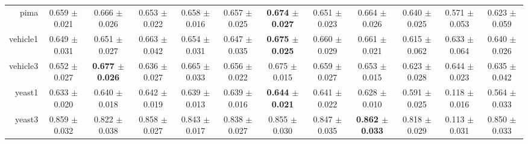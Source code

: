\begin{table}[!ht]
{\begin{tabular}{r c c c c c c c c c c c}
pima & 0.659 $\pm$ 0.021 & 0.666 $\pm$ 0.026 & 0.653 $\pm$ 0.022 & 0.658 $\pm$ 0.016 & 0.657 $\pm$ 0.025 & \textbf{0.674 $\pm$ 0.027} & 0.651 $\pm$ 0.023 & 0.664 $\pm$ 0.026 & 0.640 $\pm$ 0.025 & 0.571 $\pm$ 0.053 & 0.623 $\pm$ 0.059 \\
vehicle1 & 0.649 $\pm$ 0.031 & 0.651 $\pm$ 0.027 & 0.663 $\pm$ 0.042 & 0.654 $\pm$ 0.031 & 0.647 $\pm$ 0.035 & \textbf{0.675 $\pm$ 0.025} & 0.660 $\pm$ 0.029 & 0.661 $\pm$ 0.021 & 0.615 $\pm$ 0.062 & 0.633 $\pm$ 0.064 & 0.640 $\pm$ 0.026 \\
vehicle3 & 0.652 $\pm$ 0.027 & \textbf{0.677 $\pm$ 0.026} & 0.636 $\pm$ 0.027 & 0.665 $\pm$ 0.033 & 0.656 $\pm$ 0.022 & 0.675 $\pm$ 0.015 & 0.659 $\pm$ 0.027 & 0.653 $\pm$ 0.015 & 0.623 $\pm$ 0.028 & 0.644 $\pm$ 0.023 & 0.635 $\pm$ 0.042 \\
yeast1 & 0.633 $\pm$ 0.020 & 0.640 $\pm$ 0.018 & 0.642 $\pm$ 0.019 & 0.639 $\pm$ 0.013 & 0.639 $\pm$ 0.016 & \textbf{0.644 $\pm$ 0.021} & 0.641 $\pm$ 0.022 & 0.628 $\pm$ 0.010 & 0.591 $\pm$ 0.025 & 0.118 $\pm$ 0.016 & 0.564 $\pm$ 0.033 \\
yeast3 & 0.859 $\pm$ 0.032 & 0.822 $\pm$ 0.038 & 0.858 $\pm$ 0.027 & 0.843 $\pm$ 0.017 & 0.838 $\pm$ 0.027 & 0.855 $\pm$ 0.030 & 0.847 $\pm$ 0.035 & \textbf{0.862 $\pm$ 0.033} & 0.818 $\pm$ 0.029 & 0.113 $\pm$ 0.031 & 0.850 $\pm$ 0.033 \\
\end{tabular}}
\end{table}
